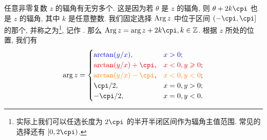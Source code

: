 任意非零复数 $z$ 的辐角有无穷多个.
这是因为若 $\theta$ 是 $z$ 的辐角, 则 $\theta+2k\cpi$ 也是 $z$ 的辐角, 其中 $k$ 是任意整数.
我们固定选择 $\operatorname{Arg} z$ 中位于区间 $(-\cpi,\cpi]$ 的那个, 并称之为\footnote{%
  实际上我们可以任选长度为 $2\cpi$ 的半开半闭区间作为辐角主值范围. 常见的选择还有 $[0,2\cpi)$.
}, 记作 .
那么 $\Arg z=\arg z+2k\cpi, k\in\BZ$.
根据 $z$ 所处的位置, 我们有
\begin{equation}
  \label{eq:arg}
  \arg z=\begin{cases}
    {\color{main}\arctan(y/x)},&
      {\color{main}x>0};\\
    {\color{second}\arctan(y/x)+\cpi},&
      {\color{second}x<0,y\ge0};\\
    {\color{fifth}\arctan(y/x)-\cpi},&
      {\color{fifth}x<0,y<0};\\
    \cpi/2,&
      x=0,y>0;\\
    -\cpi/2,&
      x=0,y<0.
  \end{cases}
\end{equation}

